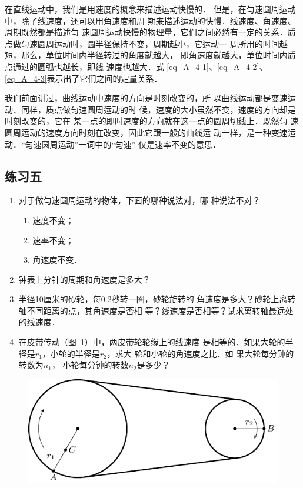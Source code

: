     在直线运动中，我们是用速度的概念来描述运动快慢的．
但是，在匀速圆周运动中，除了线速度，还可以用角速度和周
期来描述运动的快慢．线速度、角速度、周期既然都是描述匀
速圆周运动快慢的物理量，它们之间必然有一定的关系．质
点做匀速圆周运动时，圆半径保持不变，周期越小，它运动一
周所用的时间越短，那么，单位时间内半径转过的角度就越大，
即角速度就越大，单位时间内质点通过的圆弧也越长，即线
速度也越大．式 \eqref{eq_A_4-1}、\eqref{eq_A_4-2}、\eqref{eq_A_4-3}表示出了它们之间的定量关系．

    我们前面讲过，曲线运动中速度的方向是时刻改变的，所
以曲线运动都是变速运动．同样，质点做匀速圆周运动的时
候，速度的大小虽然不变，速度的方向却是时刻改变的，它在
某一点的即时速度的方向就在这一点的圆周切线上．既然匀
速圆周运动的速度方向时刻在改变，因此它跟一般的曲线运
动一样，是一种变速运动．“匀速圆周运动”一词中的“匀速”
仅是速率不变的意思．

\subsection*{练习五}
\begin{enumerate}
\item 对于做匀速圆周运动的物体，下面的哪种说法对，哪
种说法不对？
\begin{enumerate}
\item 速度不变；
\item 速率不变；
\item 角速度不变．
\end{enumerate}
\item 钟表上分针的周期和角速度是多大？
\item 半径10厘米的砂轮，每0.2秒转一圈，砂轮旋转的
角速度是多大？砂轮上离转轴不同距离的点，其角速度是否相
等？线速度是否相等？试求离转轴最远处的线速度．
\item 在皮带传动（图~\ref{fig_A_4-17}）中，两皮带轮轮缘上的线速度
是相等的．如果大轮的半径是$r_1$，小轮的半径是$r_2$，求大
轮和小轮的角速度之比．如
果大轮每分钟的转数为$n_1$，
小轮每分钟的转数$n_2$是多少？
\end{enumerate}

\begin{figure}[htbp]
    \centering
    \includegraphics{fig/A/4-17.pdf}
    \caption{}\label{fig_A_4-17}
\end{figure}

